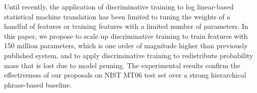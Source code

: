 Until recently, the application of discriminative training to log linear-based statistical machine translation has been limited to tuning the weights of a
 handful of features 
 or training features with a limited number of parameters.
 In this paper, we propose to scale up discriminative training to train features
 with 150 million parameters, 
 which is one order of magnitude higher than previously published system, and to
 apply discriminative training to redistribute probability mass that 
 is lost due to model pruning. The
 experimental results confirm the effectiveness of our proposals on NIST MT06
 test set
 over a strong hierarchical phrase-based baseline.

